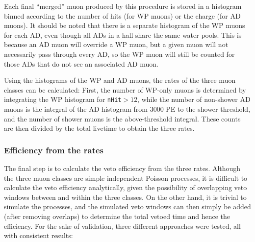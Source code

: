 \documentclass[../thesis.tex]{subfiles}
\begin{document}
Each final ``merged'' muon produced by this procedure is stored in a histogram binned according to the number of hits (for WP muons) or the charge (for AD muons). It should be noted that there is a separate histogram of the WP muons for each AD, even though all ADs in a hall share the same water pools. This is because an AD muon will override a WP muon, but a given muon will not necessarily pass through every AD, so the WP muon will still be counted for those ADs that do not see an associated AD muon.

\begin{comment}
  XXX local slides from mid-late Oct for retrigger plots. See misc_ana/MuonVetoEff/condenser4retrig.

Are our efficiencies biased because we don't count for the'' `muon multiplicity efficiency' coming from being falsely ignored as a retrigger?
\end{comment}

Using the histograms of the WP and AD muons, the rates of the three muon classes can be calculated: First, the number of WP-only muons is determined by integrating the WP histogram for \texttt{nHit}$> 12$, while the number of non-shower AD muons is the integral of the AD histogram from 3000 PE to the shower threshold, and the number of shower muons is the above-threshold integral. These counts are then divided by the total livetime to obtain the three rates.

\subsubsection{Efficiency from the rates}
\label{sec:cutVaryMuVetoEffFromRates}

The final step is to calculate the veto efficiency from the three rates. Although the three muon classes are simple independent Poisson processes, it is difficult to calculate the veto efficiency analytically, given the possibility of overlapping veto windows between and within the three classes. On the other hand, it is trivial to simulate the processes, and the simulated veto windows can then simply be added (after removing overlaps) to determine the total vetoed time and hence the efficiency. For the sake of validation, three different approaches were tested, all with consistent results:
\end{document}

